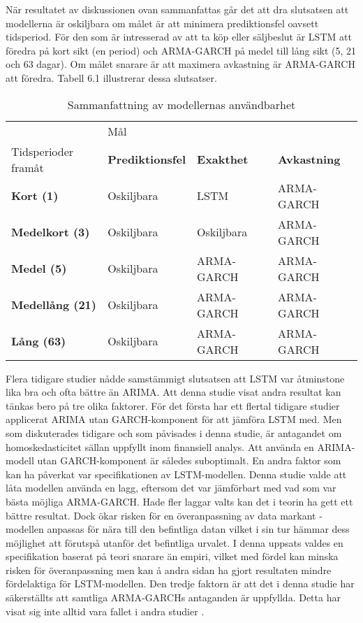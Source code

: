 \documentclass[11pt]{article}
\numberwithin{equation}{section}
\numberwithin{table}{section}
\numberwithin{figure}{section}
\begin{document}
När resultatet av diskussionen ovan sammanfattas går det att dra slutsatsen att modellerna är oskiljbara om målet är att minimera prediktionsfel oavsett tidsperiod. För den som är intresserad av att ta köp eller säljbeslut är LSTM att föredra på kort sikt (en period) och ARMA-GARCH på medel till lång sikt (5, 21 och 63 dagar). Om målet snarare är att maximera avkastning är ARMA-GARCH att föredra. Tabell 6.1 illustrerar dessa slutsatser.

\begin{table}[H]
\caption{Sammanfattning av modellernas användbarhet}
\begin{adjustbox}{width=1\textwidth}
\begin{tabular}{||llll||}
\hline
& \multicolumn{3}{l||}{Mål} \\
Tidsperioder framåt & \textbf{Prediktionsfel} & \textbf{Exakthet} & \textbf{Avkastning}\\ \hline\hline
{\textbf{Kort (1)}} & Oskiljbara          & LSTM & ARMA-GARCH\\ \cline{2-4} 
{\textbf{Medelkort (3)}} & Oskiljbara          & Oskiljbara & ARMA-GARCH\\ \cline{2-4} 
{\textbf{Medel (5)}}       & Oskiljbara        & ARMA-GARCH & ARMA-GARCH\\ \cline{2-4}
{\textbf{Medellång (21)}}       & Oskiljbara        & ARMA-GARCH & ARMA-GARCH\\ \cline{2-4}
{\textbf{Lång (63)}}       & Oskiljbara        & ARMA-GARCH & ARMA-GARCH \\
\hline
\end{tabular}
\end{adjustbox}
\end{table}

Flera tidigare studier nådde samstämmigt slutsatsen att LSTM var åtminstone lika bra och ofta bättre än ARIMA. Att denna studie visat andra resultat kan tänkas bero på tre olika faktorer. För det första har ett flertal tidigare studier applicerat ARIMA utan GARCH-komponent för att jämföra LSTM med. Men som diskuterades tidigare och som påvisades i denna studie, är antagandet om homoskedasticitet sällan uppfyllt inom finansiell analys. Att använda en ARIMA-modell utan GARCH-komponent är således suboptimalt. En andra faktor som kan ha påverkat var specifikationen av LSTM-modellen. Denna studie valde att låta modellen använda en lagg, eftersom det var jämförbart med vad som var bästa möjliga ARMA-GARCH. Hade fler laggar valts kan det i teorin ha gett ett bättre resultat. Dock ökar risken för en överanpassning av data markant -  modellen anpassas för nära till den befintliga datan vilket i sin tur hämmar dess möjlighet att förutspå utanför det befintliga urvalet. I denna uppsats valdes en specifikation baserat på teori snarare än empiri, vilket med fördel kan minska risken för överanpassning men kan å andra sidan ha gjort resultaten mindre fördelaktiga för LSTM-modellen. Den tredje faktorn är att det i denna studie har säkerställts att samtliga ARMA-GARCHs antaganden är uppfyllda. Detta har visat sig inte alltid vara fallet i andra studier \parencite{paliwal2009neural}. 
\end{document}
